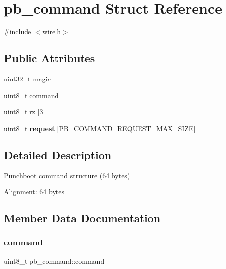 \hypertarget{structpb__command}{}\section{pb\+\_\+command Struct Reference}
\label{structpb__command}


{\ttfamily \#include $<$wire.\+h$>$}

\subsection*{Public Attributes}
\begin{DoxyCompactItemize}
\item 
uint32\+\_\+t \hyperlink{structpb__command_a30bf4a04fc414f789f9c9bb6eb3170c3}{magic}
\item 
uint8\+\_\+t \hyperlink{structpb__command_ac3e1f16f1bfe6daec419cf9ec1b51b1e}{command}
\item 
uint8\+\_\+t \hyperlink{structpb__command_abaf981ef1685501792ec2510789d0269}{rz} \mbox{[}3\mbox{]}
\item 
\mbox{\label{structpb__command_a83e52f4f19b5351dc6de7d1bddc9aa8f}} 
uint8\+\_\+t {\bfseries request} \mbox{[}\hyperlink{wire_8h_ab4a82f18920c6584ecf0a2d918d803e0}{P\+B\+\_\+\+C\+O\+M\+M\+A\+N\+D\+\_\+\+R\+E\+Q\+U\+E\+S\+T\+\_\+\+M\+A\+X\+\_\+\+S\+I\+ZE}\mbox{]}
\end{DoxyCompactItemize}


\subsection{Detailed Description}
Punchboot command structure (64 bytes)

Alignment\+: 64 bytes 

\subsection{Member Data Documentation}
\mbox{\label{structpb__command_ac3e1f16f1bfe6daec419cf9ec1b51b1e}} 
\subsubsection{\texorpdfstring{command}{command}}
{\footnotesize\ttfamily uint8\+\_\+t pb\+\_\+command\+::command}


